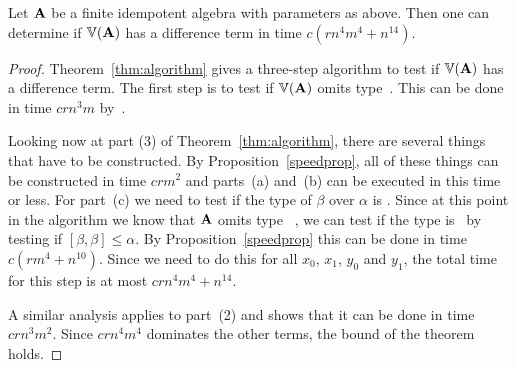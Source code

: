 \documentclass{ws-ijac}
\begin{document}








\begin{theorem}\label{thm:time}
Let $\mathbf{A}$ be a finite idempotent algebra with parameters as
above.
Then one can determine if $\operatorname{\mathbb{V}}(\mathbf{A})$ has a difference
term in time $c(rn^4m^4 + n^{14})$.
\end{theorem}

\begin{proof}
Theorem~\ref{thm:algorithm} gives a three-step
algorithm to test
if $\operatorname{\mathbb{V}} (\mathbf{A})$ has a difference term.
The first step is to test if $\operatorname{\mathbb{V}} (\mathbf{A})$ omits type~\utyp. This
can be done in time $crn^3m$
by~\cite[Theorem~6.3]{Freese:2009}.

Looking now at part (3) of Theorem~\ref{thm:algorithm},
there are several things that have to be constructed.
By Proposition~\ref{speedprop}, all
of these things can be constructed in time $crm^2$ and
parts~(a) and~(b) can be executed in this time or less.
For part~(c) we need to test if the type of $\beta$
over $\alpha$ is \atyp. Since at this point in the
algorithm we know that $\mathbf{A}$ omits type ~\utyp,
we can test if the type is \atyp\ by testing if
$[\beta,\beta] \le \alpha$. By Proposition~\ref{speedprop}
this can be done in time $c(rm^4 + n^{10})$.
Since we need to do
this for all $x_0$, $x_1$, $y_0$ and $y_1$, the total
time for this step is at most $crn^4m^4 + n^{14}$.

A similar analysis applies to part~(2) and shows that it
can be done in time $crn^3m^2$. Since $crn^4m^4$ dominates
the other terms, the bound of the theorem holds.
\end{proof}
\end{document}
